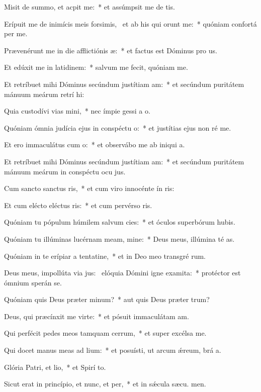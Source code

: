 \item Misit de summo, et acpit me:~* et assúmpsit me de  tis.
\item Erípuit me de inimícis meis forsimis,~\pscross{} et ab his qui orunt me:~* quóniam confortá  per me.
\item Prævenérunt me in die afflictiónis æ:~* et factus est Dóminus pro us.
\item Et edúxit me in latidinem:~* salvum me fecit, quóniam  me.
\item Et retríbuet mihi Dóminus secúndum justítiam am:~* et secúndum puritátem mánuum meárum retrí hi:
\item Quia custodívi vias mini,~* nec ímpie gessi a  o.
\item Quóniam ómnia judícia ejus in conspéctu o:~* et justítias ejus non ré  me.
\item Et ero immaculátus cum o:~* et observábo me ab iniqui a.
\item Et retríbuet mihi Dóminus secúndum justítiam am:~* et secúndum puritátem mánuum meárum in conspéctu ocu jus.
\item Cum sancto sanctus ris,~* et cum viro innocénte ín ris:
\item Et cum elécto eléctus ris:~* et cum pervérso ris.
\item Quóniam tu pópulum húmilem salvum cies:~* et óculos superbórum hubis.
\item Quóniam tu illúminas lucérnam meam, mine:~* Deus meus, illúmina té as.
\item Quóniam in te erípiar a tentatine,~* et in Deo meo transgré rum.
\item Deus meus, impollúta via jus:~\pscross{} elóquia Dómini igne examita:~* protéctor est ómnium sperán  se.
\item Quóniam quis Deus præter minum?~* aut quis Deus præter  trum?
\item Deus, qui præcínxit me virte:~* et pósuit immaculátam  am.
\item Qui perfécit pedes meos tamquam cerrum,~* et super excélsa  me.
\item Qui docet manus meas ad lium:~* et posuísti, ut arcum ǽreum, brá a.
\item Glória Patri, et lio,~* et Spirí to.
\item Sicut erat in princípio, et nunc, et per,~* et in sǽcula sæcu. men.
